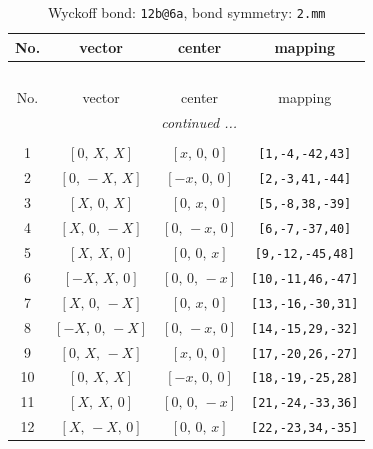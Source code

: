 \documentclass[fleqn,8pt]{jsarticle}
\begin{document}
\begin{longtable}{cccc}
\caption{Wyckoff bond: {\tt 12b@6a}, bond symmetry: {\tt 2.mm}}
 \\
 \hline \hline
No. & vector & center & mapping \\ \hline \endfirsthead

\multicolumn{3}{l}{\tablename\ \thetable{}} \\
 \hline \hline
No. & vector & center & mapping \\ \hline \endhead

 \hline \hline
\multicolumn{3}{r}{\footnotesize\it continued ...} \\ \endfoot

 \hline \hline
\multicolumn{3}{r}{} \\ \endlastfoot

1 & $\left[ 0,\, X,\, X \right]$ & $\left[ x,\, 0,\, 0 \right]$ & {\tt [1,-4,-42,43]} \\ \hline
2 & $\left[ 0,\, - X,\, X \right]$ & $\left[ - x,\, 0,\, 0 \right]$ & {\tt [2,-3,41,-44]} \\ \hline
3 & $\left[ X,\, 0,\, X \right]$ & $\left[ 0,\, x,\, 0 \right]$ & {\tt [5,-8,38,-39]} \\ \hline
4 & $\left[ X,\, 0,\, - X \right]$ & $\left[ 0,\, - x,\, 0 \right]$ & {\tt [6,-7,-37,40]} \\ \hline
5 & $\left[ X,\, X,\, 0 \right]$ & $\left[ 0,\, 0,\, x \right]$ & {\tt [9,-12,-45,48]} \\ \hline
6 & $\left[ - X,\, X,\, 0 \right]$ & $\left[ 0,\, 0,\, - x \right]$ & {\tt [10,-11,46,-47]} \\ \hline
7 & $\left[ X,\, 0,\, - X \right]$ & $\left[ 0,\, x,\, 0 \right]$ & {\tt [13,-16,-30,31]} \\ \hline
8 & $\left[ - X,\, 0,\, - X \right]$ & $\left[ 0,\, - x,\, 0 \right]$ & {\tt [14,-15,29,-32]} \\ \hline
9 & $\left[ 0,\, X,\, - X \right]$ & $\left[ x,\, 0,\, 0 \right]$ & {\tt [17,-20,26,-27]} \\ \hline
10 & $\left[ 0,\, X,\, X \right]$ & $\left[ - x,\, 0,\, 0 \right]$ & {\tt [18,-19,-25,28]} \\ \hline
11 & $\left[ X,\, X,\, 0 \right]$ & $\left[ 0,\, 0,\, - x \right]$ & {\tt [21,-24,-33,36]} \\ \hline
12 & $\left[ X,\, - X,\, 0 \right]$ & $\left[ 0,\, 0,\, x \right]$ & {\tt [22,-23,34,-35]} \\
\end{longtable}
\renewcommand{\arraystretch}{1.2}
\end{document}
